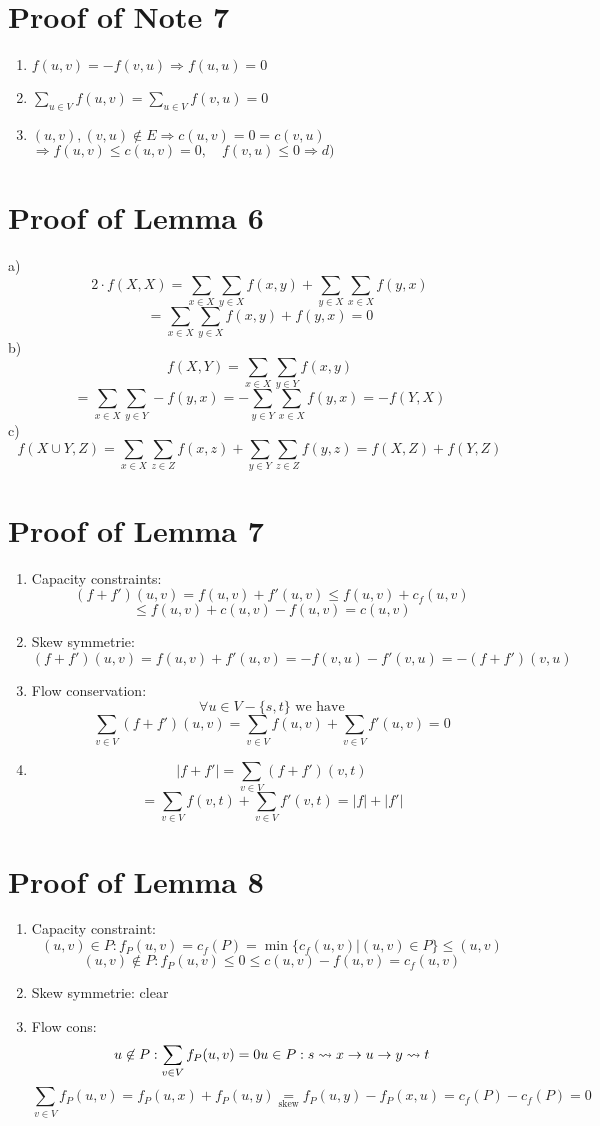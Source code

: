 \documentclass[12pt,oneside,a4paper,parskip=on,fleqn]{scrartcl}
\begin{document}
\section*{Proof of Note 7}
\begin{enumerate}
	\item $f(u,v) = -f(v,u) \Rightarrow f(u,u) = 0$
	\item $\sum_{u\in V} f(u,v) = \sum_{u\in V} f(v,u) = 0$
	\item $(u,v),(v,u)\not\in E \Rightarrow c(u,v) = 0 = c(v,u)$\\
	$\Rightarrow f(u,v) \leq c(u,v) = 0,\quad f(v,u) \leq 0 \Rightarrow d)$
\end{enumerate}

\section*{Proof of Lemma 6}
a) $$2\cdot f(X,X) = \sum_{x\in X}\sum_{y\in X} f(x,y) + \sum_{y\in X} \sum_{x\in X} f(y,x)$$
$$=\sum_{x\in X}\sum_{y\in X} f(x,y) + f(y,x) = 0$$
b) $$f(X,Y) = \sum_{x\in X}\sum_{y\in Y} f(x,y)$$
$$=\sum_{x\in X}\sum_{y\in Y}-f(y,x)=-\sum_{y\in Y}\sum_{x\in X} f(y,x) = -f(Y,X)$$
c) $$f(X\cup Y,Z) = \sum_{x\in X} \sum_{z\in Z} f(x,z) + \sum_{y\in Y}\sum_{z\in Z} f(y,z) = f(X,Z) + f(Y,Z)$$

\section*{Proof of Lemma 7}
\begin{enumerate}
	\item Capacity constraints:
		$$(f+f')(u,v) = f(u,v) + f'(u,v)\leq f(u,v) + c_f(u,v)$$
		$$\leq f(u,v) + c(u,v) - f(u,v) = c(u,v)$$
	\item Skew symmetrie:
		$$(f+f')(u,v) = f(u,v) + f'(u,v) = -f(v,u) - f'(v,u) = -(f+f')(v,u)$$
	\item Flow conservation:
		$$\forall u\in V-\{s,t\} \text{ we have}$$
		$$\sum_{v\in V} (f+f')(u,v) = \sum_{v\in V} f(u,v) + \sum_{v\in V} f'(u,v) = 0$$
	\item $$|f+f'|= \sum_{v\in V}(f+f')(v,t)$$
	$$=\sum_{v\in V} f(v,t) + \sum_{v\in V} f'(v,t) = |f| + |f'|$$
\end{enumerate}

\section*{Proof of Lemma 8} %
\label{sec:proof_of_lemma_8}
\begin{enumerate}
	\item Capacity constraint:
		\[
			(u,v)\in P: f_P(u,v) = c_f(P) = \min\{c_f(u,v)| (u,v)\in P\}\leq (u,v)\]
			\[
			(u,v)\not\in P: f_P(u,v) \leq 0 \leq c(u,v)-f(u,v) = c_f(u,v)
		\]
	\item Skew symmetrie: clear
	\item Flow cons:
		\[
			u\not\in P: \sum_{v\in V} f_P(u,v) = 0\\
			u\in P: s\rightsquigarrow x\to u\to y\rightsquigarrow t
		\]
		\[
			\sum_{v\in V} f_P(u,v) = f_P(u,x) + f_P(u,y) \underset{\text{skew}}{=} f_P(u,y) - f_P(x,u) = c_f(P) - c_f(P) = 0
		\]
\end{enumerate}
\end{document}
